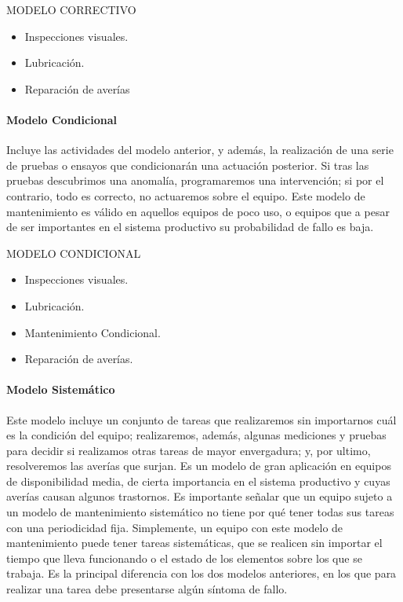 \documentclass[../main]{subfiles}
\begin{document}
\begin{tcolorbox}
MODELO CORRECTIVO
\tcblower
\begin{itemize}
 \item Inspecciones visuales.
 \item Lubricación.
 \item Reparación de averías
\end{itemize}
 \end{tcolorbox}

\paragraph{Modelo Condicional}
Incluye las actividades del modelo anterior, y además, la realización de
una serie de pruebas o ensayos que condicionarán una actuación posterior. Si
tras las pruebas descubrimos una anomalía, programaremos una intervención;
si por el contrario, todo es correcto, no actuaremos sobre el equipo.
Este modelo de mantenimiento es válido en aquellos equipos de poco uso,
o equipos que a pesar de ser importantes en el sistema productivo su probabilidad de fallo es baja.

\begin{tcolorbox}
MODELO CONDICIONAL
\tcblower
\begin{itemize}
\item Inspecciones visuales.
\item Lubricación.
\item Mantenimiento Condicional.
\item Reparación de averías.
\end{itemize}

\end{tcolorbox}

\paragraph{Modelo Sistemático}
Este modelo incluye un conjunto de tareas que realizaremos sin importarnos cuál es la condición del equipo; realizaremos, además, algunas mediciones y pruebas para decidir si realizamos otras tareas de mayor envergadura; y, por ultimo, resolveremos las averías que surjan. Es un modelo de
gran aplicación en equipos de disponibilidad media, de cierta importancia en
el sistema productivo y cuyas averías causan algunos trastornos. Es importante señalar que un equipo sujeto a un modelo de mantenimiento sistemático no tiene por qué tener todas sus tareas con una periodicidad fija. Simplemente, un equipo con este modelo de mantenimiento puede tener tareas sistemáticas, que se realicen sin importar el tiempo que lleva funcionando o el estado de los elementos sobre los que se trabaja. Es la principal diferencia con los dos modelos anteriores, en los que para realizar una tarea debe presentarse algún síntoma de fallo.
\end{document}
